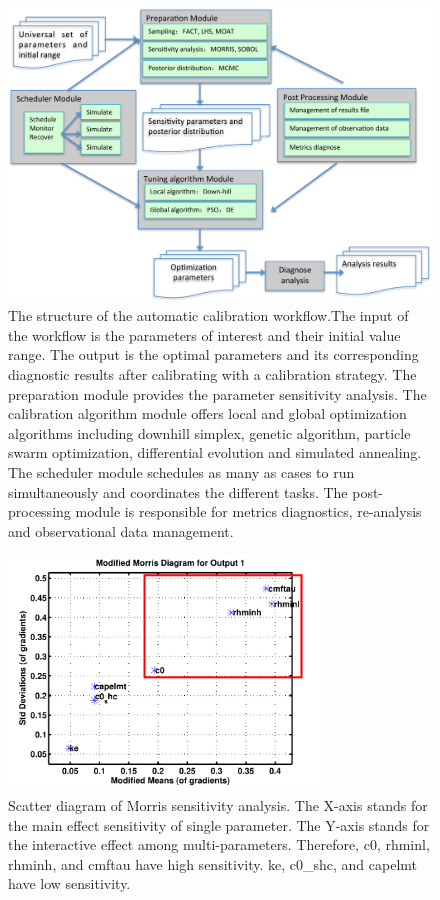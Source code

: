 \documentclass[gmd, manuscript]{copernicus}
\begin{document}
\begin{figure}[t]
\includegraphics[width=15.3cm]{workflow}
\caption{The structure of the automatic calibration workflow.The input of the workflow is the parameters of interest and their initial value range. The
output is the optimal parameters and its corresponding diagnostic results after calibrating with a calibration strategy. The preparation module provides the parameter sensitivity analysis. The calibration algorithm module offers local and global optimization algorithms including downhill simplex, genetic algorithm, particle swarm optimization, differential evolution and simulated annealing. The scheduler module schedules as many as cases to run simultaneously and coordinates the different tasks. The post-processing module is responsible for metrics diagnostics, re-analysis and observational data management.}
\end{figure}

\begin{figure}[t]
\includegraphics[width=8.3cm]{Morris}
\caption{Scatter diagram of Morris sensitivity analysis. The X-axis stands for the main effect sensitivity of single parameter. The Y-axis stands for the interactive effect among multi-parameters. Therefore, c0, rhminl, rhminh, and cmftau have high sensitivity. ke, c0\_shc, and capelmt have low sensitivity.}
\end{figure}
\end{document}
